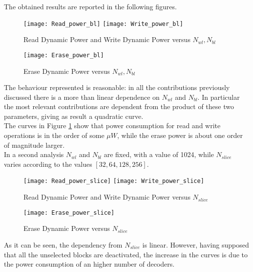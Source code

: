 The obtained results are reported in the following figures. 

\begin{figure}[H] 
	\begin{center}
		\texttt{[image: Read\_power\_bl]}
		\texttt{[image: Write\_power\_bl]}
	\end{center}
	\caption{Read Dynamic Power and Write Dynamic Power versus $N_{wl},N_{bl}$}
	\label{readwrite}
\end{figure}

\begin{figure}[H] 
	\begin{center}
		\texttt{[image: Erase\_power\_bl]}
	\end{center}
	\caption{Erase Dynamic Power versus $N_{wl},N_{bl}$}
\end{figure}

The behaviour represented is reasonable: in all the contributions previously discussed there is a more than linear dependence on $N_{wl}$ and $N_{bl}$. In particular the most relevant contributions are dependent from the product of these two parameters, giving as result a quadratic curve.\\
The curves in Figure \ref{readwrite} show that power consumption for read and write operations is in the order of some $\mu W$, while the erase power is about one order of magnitude larger.\\
In a second analysis $N_{wl}$ and $N_{bl}$ are fixed, with a value of 1024, while $N_{slice}$ varies according to the values $[32, 64, 128, 256]$.
\begin{figure}[H] 
	\begin{center}
		\texttt{[image: Read\_power\_slice]}
		\texttt{[image: Write\_power\_slice]}
	\end{center}
	\caption{Read Dynamic Power and Write Dynamic Power versus $N_{slice}$}
\end{figure}

\begin{figure}[H] 
	\begin{center}
		\texttt{[image: Erase\_power\_slice]}
	\end{center}
	\caption{Erase Dynamic Power versus $N_{slice}$}
\end{figure}

As it can be seen, the dependency from $N_{slice}$ is linear. However, having supposed that all the unselected blocks are deactivated, the increase in the curves is due to the power consumption of an higher number of decoders.